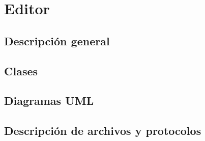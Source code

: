 \documentclass[a4paper]{article}
\begin{document}
\section{Editor}

\subsection{Descripción general}

\subsection{Clases}

\subsection{Diagramas UML}

\subsection{Descripción de archivos y protocolos}
\end{document}
